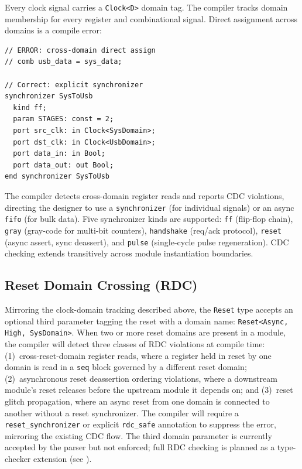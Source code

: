 \documentclass[11pt,twocolumn]{article}
\begin{document}
Every clock signal carries a \texttt{Clock<D>} domain tag. The compiler tracks domain membership for every register and combinational signal. Direct assignment across domains is a compile error:

\begin{lstlisting}[language=Arch,caption={Clock domain crossing via synchronizer},label={lst:cdc}]
// ERROR: cross-domain direct assign
// comb usb_data = sys_data;

// Correct: explicit synchronizer
synchronizer SysToUsb
  kind ff;
  param STAGES: const = 2;
  port src_clk: in Clock<SysDomain>;
  port dst_clk: in Clock<UsbDomain>;
  port data_in: in Bool;
  port data_out: out Bool;
end synchronizer SysToUsb
\end{lstlisting}

The compiler detects cross-domain register reads and reports CDC violations, directing the designer to use a \texttt{synchronizer} (for individual signals) or an async \texttt{fifo} (for bulk data). Five synchronizer kinds are supported: \texttt{ff} (flip-flop chain), \texttt{gray} (gray-code for multi-bit counters), \texttt{handshake} (req/ack protocol), \texttt{reset} (async assert, sync deassert), and \texttt{pulse} (single-cycle pulse regeneration). CDC checking extends transitively across module instantiation boundaries.

\subsection{Reset Domain Crossing (RDC)}

Mirroring the clock-domain tracking described above, the \texttt{Reset} type accepts an optional third parameter tagging the reset with a domain name: \texttt{Reset<Async, High, SysDomain>}. When two or more reset domains are present in a module, the compiler will detect three classes of RDC violations at compile time:
(1)~cross-reset-domain register reads, where a register held in reset by one domain is read in a \texttt{seq} block governed by a different reset domain;
(2)~asynchronous reset deassertion ordering violations, where a downstream module's reset releases before the upstream module it depends on; and
(3)~reset glitch propagation, where an async reset from one domain is connected to another without a reset synchronizer.
The compiler will require a \texttt{reset\_synchronizer} or explicit \texttt{rdc\_safe} annotation to suppress the error, mirroring the existing CDC flow. The third domain parameter is currently accepted by the parser but not enforced; full RDC checking is planned as a type-checker extension (see ).
\end{document}

